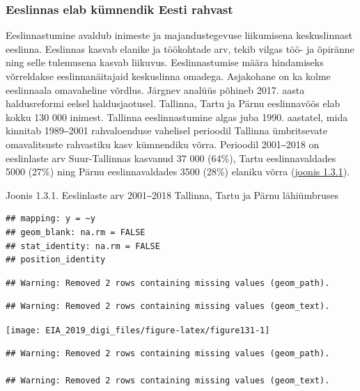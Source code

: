 \documentclass[estonian,]{article}
\begin{document}
\hypertarget{eeslinnas-elab-kuxfcmnendik-eesti-rahvast}{%
\subsubsection*{Eeslinnas elab kümnendik Eesti rahvast}\label{eeslinnas-elab-kuxfcmnendik-eesti-rahvast}}

Eeslinnastumine avaldub inimeste ja majandustegevuse liikumisena keskuslinnast eeslinna. Eeslinnas kasvab elanike ja töökohtade arv, tekib vilgas töö- ja õpiränne ning selle tulemusena kasvab liikuvus. Eeslinnastumise määra hindamiseks võrreldakse eeslinnanäitajaid keskuslinna omadega. Asjakohane on ka kolme eeslinnaala omavaheline võrdlus. Järgnev analüüs põhineb 2017. aasta haldusreformi eelsel haldusjaotusel.
Tallinna, Tartu ja Pärnu eeslinnavöös elab kokku 130 000 inimest. Tallinna eeslinnastumine algas juba 1990. aastatel, mida kinnitab 1989‒2001 rahvaloenduse vahelisel perioodil Tallinna ümbritsevate omavalitsuste rahvastiku kasv kümnendiku võrra. Perioodil 2001‒2018 on eeslinlaste arv Suur-Tallinnas kasvanud 37 000 (64\%), Tartu eeslinnavaldades 5000 (27\%) ning Pärnu eeslinnavaldades 3500 (28\%) elaniku võrra (\protect\hyperlink{figure131}{joonis 1.3.1}).

{Joonis 1.3.1.} Eeslinlaste arv 2001‒2018 Tallinna, Tartu ja Pärnu lähiümbruses

\begin{verbatim}
## mapping: y = ~y 
## geom_blank: na.rm = FALSE
## stat_identity: na.rm = FALSE
## position_identity
\end{verbatim}

\begin{verbatim}
## Warning: Removed 2 rows containing missing values (geom_path).
\end{verbatim}

\begin{verbatim}
## Warning: Removed 2 rows containing missing values (geom_text).
\end{verbatim}

\begin{center}\texttt{[image: EIA\_2019\_digi\_files/figure-latex/figure131-1]} \end{center}

\begin{verbatim}
## Warning: Removed 2 rows containing missing values (geom_path).

## Warning: Removed 2 rows containing missing values (geom_text).
\end{verbatim}
\end{document}
